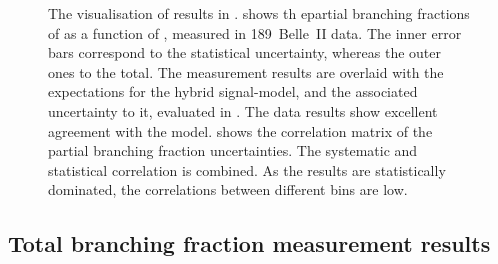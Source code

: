 \begin{figure}[htbp!]
    \centering


    \caption{\label{fig:partial_and_correlation} 
    The visualisation of results in  .
     shows th epartial branching fractions of \BtoXsgamma 
    as a function of \EB, measured in 189~\invfb Belle~II data.
    The inner error bars correspond to the statistical uncertainty, whereas the outer ones to the total.
    The measurement results are overlaid with the expectations for the hybrid signal-model, and the associated uncertainty to it, evaluated in .
    The data results show excellent agreement with the model.
     shows 
    the correlation matrix of the partial branching fraction uncertainties.
    The systematic and statistical correlation is combined.
    As the results are statistically dominated, the correlations between different \EB bins are low.
    }
\end{figure}

\subsection{Total branching fraction measurement results}\label{sec:total_branching_fraction_results}

